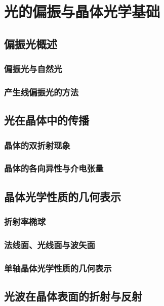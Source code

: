 \documentclass[cn,10pt,chinesefont=founder,math=mtpro2,cite=super,toc=onecol,twoside,openany]{elegantbook}
\begin{document}
\chapter{光的偏振与晶体光学基础}

\section{偏振光概述}

\subsection{偏振光与自然光}

\subsection{产生线偏振光的方法}

\section{光在晶体中的传播}

\subsection{晶体的双折射现象}

\subsection{晶体的各向异性与介电张量}

\section{晶体光学性质的几何表示}

\subsection{折射率椭球}

\subsection{法线面、光线面与波矢面}

\subsection{单轴晶体光学性质的几何表示}

\section{光波在晶体表面的折射与反射}
\end{document}

